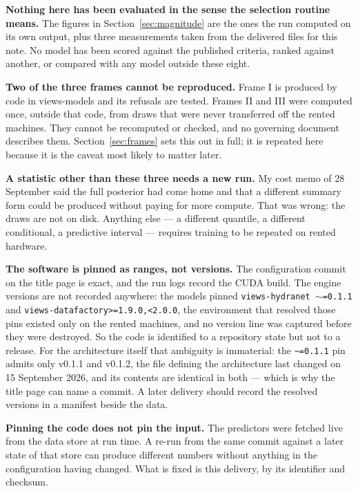 \textbf{Nothing here has been evaluated in the sense the selection routine means.} The figures in
Section~\ref{sec:magnitude} are the ones the run computed on its own output, plus three
measurements taken from the delivered files for this note. No model has been scored against the
published criteria, ranked against another, or compared with any model outside these eight.

\textbf{Two of the three frames cannot be reproduced.} Frame I is produced by code in views-models
and its refusals are tested. Frames II and III were computed once, outside that code, from draws
that were never transferred off the rented machines. They cannot be recomputed or checked, and no
governing document describes them. Section~\ref{sec:frames} sets this out in full; it is repeated
here because it is the caveat most likely to matter later.

\textbf{A statistic other than these three needs a new run.} My cost memo of 28 September said the
full posterior had come home and that a different summary form could be produced without paying
for more compute. That was wrong: the draws are not on disk. Anything else --- a different
quantile, a different conditional, a predictive interval --- requires training to be repeated on
rented hardware.

\textbf{The software is pinned as ranges, not versions.} The configuration commit on the title page
is exact, and the run logs record the CUDA build. The engine versions are not recorded anywhere:
the models pinned \texttt{views-hydranet~}$\sim$\texttt{=0.1.1} and
\texttt{views-datafactory>=1.9.0,<2.0.0}, the environment that resolved those pins existed only on
the rented machines, and no version line was captured before they were destroyed. So the code is
identified to a repository state but not to a release. For the architecture itself that ambiguity is
immaterial: the \texttt{\textasciitilde{}=0.1.1} pin admits only v0.1.1 and v0.1.2, the file
defining the architecture last changed on 15 September 2026, and its contents are identical in both
--- which is why the title page can name a commit. A later delivery should record the resolved
versions in a manifest beside the data.

\textbf{Pinning the code does not pin the input.} The predictors were fetched live from the data
store at run time. A re-run from the same commit against a later state of that store can produce
different numbers without anything in the configuration having changed. What is fixed is this
delivery, by its identifier and checksum.

